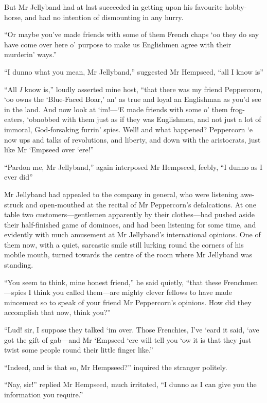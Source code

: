 But Mr Jellyband had at last succeeded in getting upon his favourite hobby-horse, and had no intention of dismounting in any hurry.

\enquote{Or maybe you've made friends with some of them French chaps `oo they do say have come over here o’ purpose to make us Englishmen agree with their murderin’ ways.}

\enquote{I dunno what you mean, Mr Jellyband,} suggested Mr Hempseed, \enquote{all I know is\longdash}

\enquote{All \textit{I} know is,} loudly asserted mine host, \enquote{that there was my friend Peppercorn, `oo owns the \enquote{Blue-Faced Boar,} an’ as true and loyal an Englishman as you'd see in the land. And now look at `im!---`E made friends with some o’ them frog-eaters, `obnobbed with them just as if they was Englishmen, and not just a lot of immoral, God-forsaking furrin’ spies. Well! and what happened? Peppercorn `e now ups and talks of revolutions, and liberty, and down with the aristocrats, just like Mr `Empseed over `ere!}

\enquote{Pardon me, Mr Jellyband,} again interposed Mr Hempseed, feebly, \enquote{I dunno as I ever did\longdash}

Mr Jellyband had appealed to the company in general, who were listening awe-struck and open-mouthed at the recital of Mr Peppercorn's defalcations. At one table two customers---gentlemen apparently by their clothes---had pushed aside their half-finished game of dominoes, and had been listening for some time, and evidently with much amusement at Mr Jellyband's international opinions. One of them now, with a quiet, sarcastic smile still lurking round the corners of his mobile mouth, turned towards the centre of the room where Mr Jellyband was standing.

\enquote{You seem to think, mine honest friend,} he said quietly, \enquote{that these Frenchmen---spies I think you called them---are mighty clever fellows to have made mincemeat so to speak of your friend Mr Peppercorn's opinions. How did they accomplish that now, think you?}

\enquote{Lud! sir, I suppose they talked `im over. Those Frenchies, I've `eard it said, `ave got the gift of gab---and Mr `Empseed `ere will tell you `ow it is that they just twist some people round their little finger like.}

\enquote{Indeed, and is that so, Mr Hempseed?} inquired the stranger politely.

\enquote{Nay, sir!} replied Mr Hempseed, much irritated, \enquote{I dunno as I can give you the information you require.}

